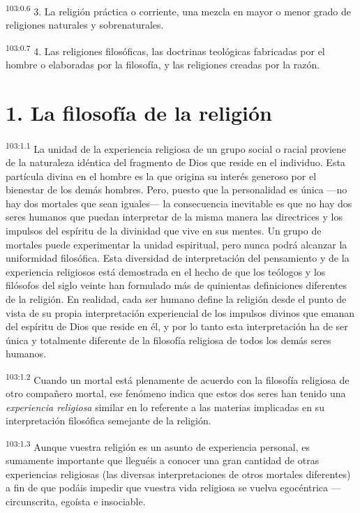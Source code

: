 \documentclass[twoside, 11pt]{book}
\begin{document}
\par
\textsuperscript{103:0.6} 3. La religión práctica o corriente, una mezcla en mayor o menor grado de religiones naturales y sobrenaturales.

\par
\textsuperscript{103:0.7} 4. Las religiones filosóficas, las doctrinas teológicas fabricadas por el hombre o elaboradas por la filosofía, y las religiones creadas por la razón.

\section*{1. La filosofía de la religión}
\par
\textsuperscript{103:1.1} La unidad de la experiencia religiosa de un grupo social o racial proviene de la naturaleza idéntica del fragmento de Dios que reside en el individuo. Esta partícula divina en el hombre es la que origina su interés generoso por el bienestar de los demás hombres. Pero, puesto que la personalidad es única ---no hay dos mortales que sean iguales--- la consecuencia inevitable es que no hay dos seres humanos que puedan interpretar de la misma manera las directrices y los impulsos del espíritu de la divinidad que vive en sus mentes. Un grupo de mortales puede experimentar la unidad espiritual, pero nunca podrá alcanzar la uniformidad filosófica. Esta diversidad de interpretación del pensamiento y de la experiencia religiosos está demostrada en el hecho de que los teólogos y los filósofos del siglo veinte han formulado más de quinientas definiciones diferentes de la religión. En realidad, cada ser humano define la religión desde el punto de vista de su propia interpretación experiencial de los impulsos divinos que emanan del espíritu de Dios que reside en él, y por lo tanto esta interpretación ha de ser única y totalmente diferente de la filosofía religiosa de todos los demás seres humanos.

\par
\textsuperscript{103:1.2} Cuando un mortal está plenamente de acuerdo con la filosofía religiosa de otro compañero mortal, ese fenómeno indica que estos dos seres han tenido una \textit{experiencia religiosa} similar en lo referente a las materias implicadas en su interpretación filosófica semejante de la religión.

\par
\textsuperscript{103:1.3} Aunque vuestra religión es un asunto de experiencia personal, es sumamente importante que lleguéis a conocer una gran cantidad de otras experiencias religiosas (las diversas interpretaciones de otros mortales diferentes) a fin de que podáis impedir que vuestra vida religiosa se vuelva egocéntrica --- circunscrita, egoísta e insociable.
\end{document}
